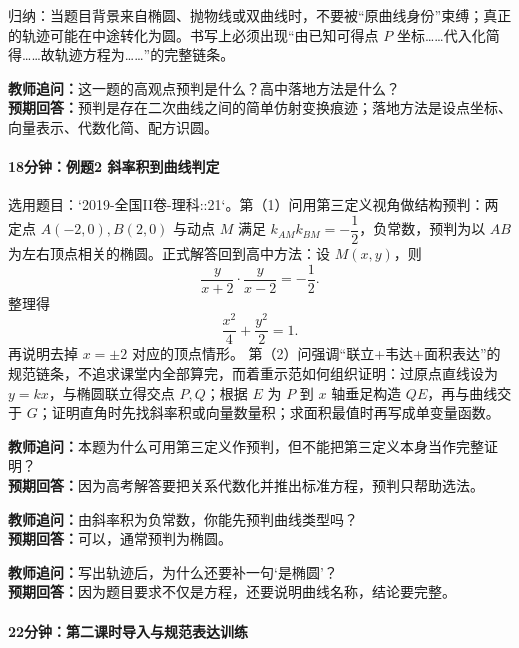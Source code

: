 \documentclass[UTF8,a4paper,11pt]{ctexart}
\begin{document}
归纳：当题目背景来自椭圆、抛物线或双曲线时，不要被“原曲线身份”束缚；真正的轨迹可能在中途转化为圆。书写上必须出现“由已知可得点 $P$ 坐标……代入化简得……故轨迹方程为……”的完整链条。

\noindent\textbf{教师追问：}这一题的高观点预判是什么？高中落地方法是什么？\\

\textbf{预期回答：}预判是存在二次曲线之间的简单仿射变换痕迹；落地方法是设点坐标、向量表示、代数化简、配方识圆。\par

\paragraph{18分钟：例题2 斜率积到曲线判定}

选用题目：`2019-全国II卷-理科::21`。第（1）问用第三定义视角做结构预判：两定点 $A(-2,0),B(2,0)$ 与动点 $M$ 满足 $k_{AM}k_{BM}=-\dfrac12$，负常数，预判为以 $AB$ 为左右顶点相关的椭圆。正式解答回到高中方法：设 $M(x,y)$，则
\[
\frac{y}{x+2}\cdot\frac{y}{x-2}=-\frac12.
\]
整理得
\[
\frac{x^2}{4}+\frac{y^2}{2}=1.
\]
再说明去掉 $x=\pm2$ 对应的顶点情形。
第（2）问强调“联立+韦达+面积表达”的规范链条，不追求课堂内全部算完，而着重示范如何组织证明：过原点直线设为 $y=kx$，与椭圆联立得交点 $P,Q$；根据 $E$ 为 $P$ 到 $x$ 轴垂足构造 $QE$，再与曲线交于 $G$；证明直角时先找斜率积或向量数量积；求面积最值时再写成单变量函数。

\noindent\textbf{教师追问：}本题为什么可用第三定义作预判，但不能把第三定义本身当作完整证明？\\

\textbf{预期回答：}因为高考解答要把关系代数化并推出标准方程，预判只帮助选法。\par

\noindent\textbf{教师追问：}由斜率积为负常数，你能先预判曲线类型吗？\\

\textbf{预期回答：}可以，通常预判为椭圆。\par

\noindent\textbf{教师追问：}写出轨迹后，为什么还要补一句‘是椭圆’？\\

\textbf{预期回答：}因为题目要求不仅是方程，还要说明曲线名称，结论要完整。\par

\paragraph{22分钟：第二课时导入与规范表达训练}
\end{document}
